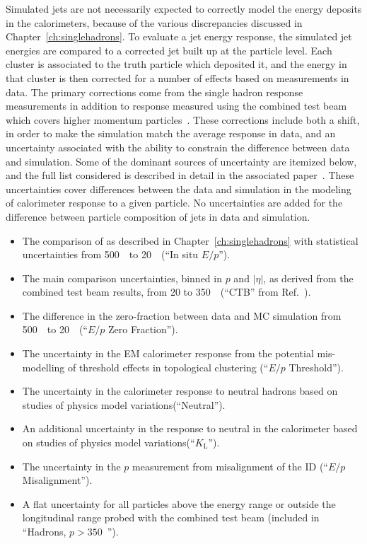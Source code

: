 Simulated jets are not necessarily expected to correctly model the energy deposits in the calorimeters, because of the various discrepancies discussed in Chapter~\ref{ch:singlehadrons}.
To evaluate a jet energy response, the simulated jet energies are compared to a corrected jet built up at the particle level.
Each cluster is associated to the truth particle which deposited it, and the energy in that cluster is then corrected for a number of effects based on measurements in data. 
The primary corrections come from the single hadron response measurements in addition to response measured using the combined test beam which covers higher momentum particles~\cite{CTB}.
These corrections include both a shift, in order to make the simulation match the average response in data, and an uncertainty associated with the ability to constrain the difference between data and simulation.
Some of the dominant sources of uncertainty are itemized below, and the full list considered is described in detail in the associated paper~\cite{PERF-2015-05}. 
These uncertainties cover differences between the data and simulation in the modeling of calorimeter response to a given particle.
No uncertainties are added for the difference between particle composition of jets in data and simulation.

\begin{itemize}
\item The comparison of \epcor as described in Chapter~\ref{ch:singlehadrons} with statistical uncertainties from 500~\MeV\ to 20~\GeV\ (``In situ $E/p$'').
\item The main \epav comparison uncertainties, binned in $p$ and $|\eta|$, as derived from the combined test beam results, from 20 to 350~\GeV\ (``CTB'' from Ref.~\cite{CTB}).
\item The difference in the zero-fraction between data and MC simulation from 500~\MeV\ to 20~\GeV\ (``$E/p$ Zero Fraction'').
\item The uncertainty in the EM calorimeter response from the potential mis-modelling of threshold effects in topological clustering (``$E/p$ Threshold'').
\item The uncertainty in the calorimeter response to neutral hadrons based on studies of physics model variations(``Neutral'').
\item An additional uncertainty in the response to neutral \pKL in the calorimeter based on studies of physics model variations(``$K_\text{L}$'').
\item The uncertainty in the $p$ measurement from misalignment of the ID (``$E/p$ Misalignment'').
\item A flat uncertainty for all particles above the energy range or outside the longitudinal range probed with the combined test beam (included in ``Hadrons, $p>350$~\GeV'').
\end{itemize}

